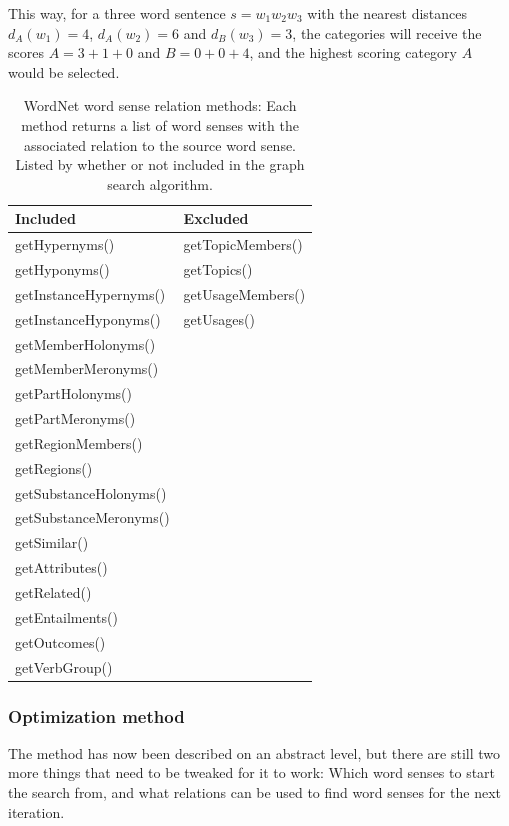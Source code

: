 \documentclass[a4paper,11pt]{kth-mag}
\begin{document}
This way, for a three word sentence $s=w_1w_2w_3$ with the nearest distances
$d_A(w_1)=4$, $d_A(w_2)=6$ and $d_B(w_3)=3$,
the categories will receive the scores $A=3+1+0$ and $B=0+0+4$, and the highest scoring category $A$
would be selected.

\begin{table}[b]
  \centering
  \begin{tabular}{| l | l |}
    \hline
    \textbf{Included} & \textbf{Excluded} \\ \hline
    getHypernyms() & getTopicMembers() \\
    getHyponyms() & getTopics() \\
    getInstanceHypernyms() & getUsageMembers() \\
    getInstanceHyponyms() & getUsages() \\
    getMemberHolonyms() & \\
    getMemberMeronyms() & \\
    getPartHolonyms() & \\
    getPartMeronyms() & \\
    getRegionMembers() & \\
    getRegions() & \\
    getSubstanceHolonyms() & \\
    getSubstanceMeronyms() & \\
    getSimilar() & \\
    getAttributes() & \\
    getRelated() & \\
    getEntailments() & \\
    getOutcomes() & \\
    getVerbGroup() & \\
    \hline
  \end{tabular}
  \caption{WordNet\cite{wordnet} word sense relation methods: Each method returns a list of word senses with the
    associated relation to the source word sense. Listed by whether or not included in the graph search algorithm.}
  \label{tab:bfs_relation}
\end{table}


\subsubsection{Optimization method}
The method has now been described on an abstract level, but there are still two more things that need to be tweaked for it to work: Which word senses to start the search from, and what relations can be used to find word senses for the next iteration.
\end{document}
